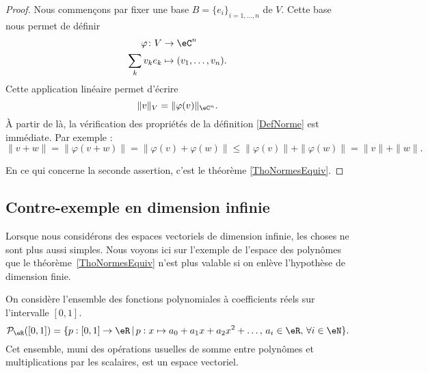 \begin{proof}
	Nous commençons par fixer une base \( B=\{ e_i \}_{i=1,\ldots, n}\) de \( V\). Cette base nous permet de définir
	\begin{equation}
		\begin{aligned}
			\varphi\colon V & \to \eC^n                  \\
			\sum_kv_ke_k    & \mapsto (v_1,\ldots, v_n).
		\end{aligned}
	\end{equation}
	Cette application linéaire permet d'écrire
	\begin{equation}
		\| v \|_V=\| \varphi(v) \|_{\eC^n}.
	\end{equation}
	À partir de là, la vérification des propriétés de la définition \ref{DefNorme} est immédiate. Par exemple :
	\begin{equation}
		\| v+w \|=\| \varphi(v+w) \|=\| \varphi(v)+\varphi(w) \|\leq \| \varphi(v) \|+\| \varphi(w) \|=\| v \|+\| w \|.
	\end{equation}

	En ce qui concerne la seconde assertion, c'est le théorème \ref{ThoNormesEquiv}.
\end{proof}

\subsection{Contre-exemple en dimension infinie}
\label{SubSecPOlynomesCE}

Lorsque nous considérons des espaces vectoriels de dimension infinie, les choses ne sont plus aussi simples. Nous voyons ici sur l'exemple de l'espace des polynômes que le théorème~\ref{ThoNormesEquiv} n'est plus valable si on enlève l'hypothèse de dimension finie.

On considère l'ensemble des fonctions polynomiales à coefficients réels sur  l'intervalle \( [0,1]\).
\begin{equation}
	\mathcal{P}_\eR([0,1])=\{p:[0,1]\to \eR\,|\, p : x\mapsto a_0+a_1 x +a_2 x^2 + \ldots, \, a_i\in\eR,\,\forall i\in \eN\}.
\end{equation}
Cet ensemble, muni des opérations usuelles de somme entre polynômes et multiplications par les scalaires, est un espace vectoriel.


